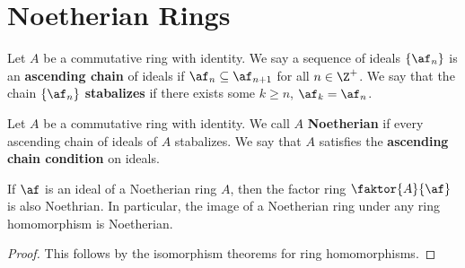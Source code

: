 \section{Noetherian Rings}

\begin{definition}
    Let $A$ be a commutative ring with identity. We say a sequence of ideals
    $\{\af_n\}$ is an \textbf{ascending chain} of ideals if $\af_n \subseteq
    \af_{n+1}$ for all $n \in \Z^+$. We say that the chain  $\{\af_n\}$
    \textbf{stabalizes} if there exists some $k \geq n$, $\af_k=\af_n$.
\end{definition}

\begin{definition}
    Let $A$ be a commutative ring with identity. We call $A$ \textbf{Noetherian}
    if every ascending chain of ideals of $A$ stabalizes. We say that $A$
    satisfies the \textbf{ascending chain condition} on ideals.
\end{definition}

\begin{lemma}\label{1.12.1}
    If $\af$ is an ideal of a Noetherian ring  $A$, then the factor ring
    $\faktor{A}{\af}$ is also Noethrian. In particular, the image of a Noetherian
    ring under any ring homomorphism is Noetherian.
\end{lemma}
\begin{proof}
    This follows by the isomorphism theorems for ring homomorphisms.
\end{proof}

